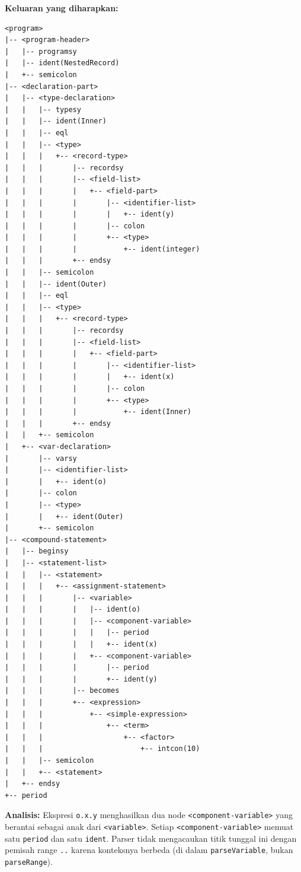 \documentclass[12pt,a4paper]{article}
\begin{document}
\textbf{Keluaran yang diharapkan:}
\begin{lstlisting}[style=default]
<program>
|-- <program-header>
|   |-- programsy
|   |-- ident(NestedRecord)
|   +-- semicolon
|-- <declaration-part>
|   |-- <type-declaration>
|   |   |-- typesy
|   |   |-- ident(Inner)
|   |   |-- eql
|   |   |-- <type>
|   |   |   +-- <record-type>
|   |   |       |-- recordsy
|   |   |       |-- <field-list>
|   |   |       |   +-- <field-part>
|   |   |       |       |-- <identifier-list>
|   |   |       |       |   +-- ident(y)
|   |   |       |       |-- colon
|   |   |       |       +-- <type>
|   |   |       |           +-- ident(integer)
|   |   |       +-- endsy
|   |   |-- semicolon
|   |   |-- ident(Outer)
|   |   |-- eql
|   |   |-- <type>
|   |   |   +-- <record-type>
|   |   |       |-- recordsy
|   |   |       |-- <field-list>
|   |   |       |   +-- <field-part>
|   |   |       |       |-- <identifier-list>
|   |   |       |       |   +-- ident(x)
|   |   |       |       |-- colon
|   |   |       |       +-- <type>
|   |   |       |           +-- ident(Inner)
|   |   |       +-- endsy
|   |   +-- semicolon
|   +-- <var-declaration>
|       |-- varsy
|       |-- <identifier-list>
|       |   +-- ident(o)
|       |-- colon
|       |-- <type>
|       |   +-- ident(Outer)
|       +-- semicolon
|-- <compound-statement>
|   |-- beginsy
|   |-- <statement-list>
|   |   |-- <statement>
|   |   |   +-- <assignment-statement>
|   |   |       |-- <variable>
|   |   |       |   |-- ident(o)
|   |   |       |   |-- <component-variable>
|   |   |       |   |   |-- period
|   |   |       |   |   +-- ident(x)
|   |   |       |   +-- <component-variable>
|   |   |       |       |-- period
|   |   |       |       +-- ident(y)
|   |   |       |-- becomes
|   |   |       +-- <expression>
|   |   |           +-- <simple-expression>
|   |   |               +-- <term>
|   |   |                   +-- <factor>
|   |   |                       +-- intcon(10)
|   |   |-- semicolon
|   |   +-- <statement>
|   +-- endsy
+-- period
\end{lstlisting}

\textbf{Analisis:} Ekspresi \texttt{o.x.y} menghasilkan dua node \texttt{<component-variable>} yang berantai sebagai anak dari \texttt{<variable>}. Setiap \texttt{<component-variable>} memuat satu \texttt{period} dan satu \texttt{ident}. Parser tidak mengacaukan titik tunggal ini dengan pemisah range \texttt{..} karena konteksnya berbeda (di dalam \texttt{parseVariable}, bukan \texttt{parseRange}).
\end{document}
